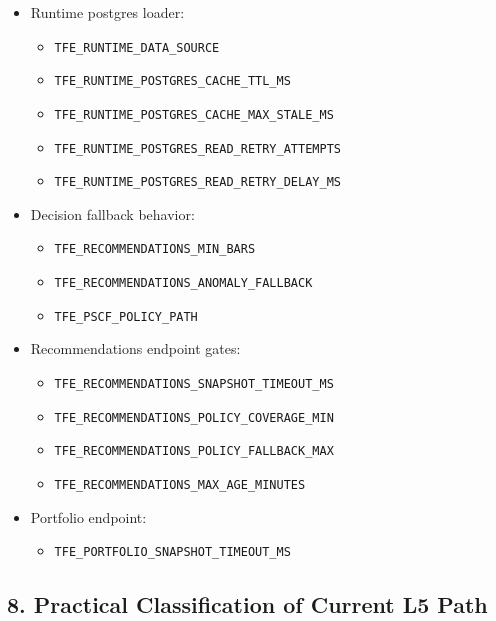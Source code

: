 \documentclass[
]{article}
\providecommand{\tightlist}{%
  \setlength{\itemsep}{0pt}\setlength{\parskip}{0pt}}
\begin{document}
\begin{itemize}
\tightlist
\item
  Runtime postgres loader:

  \begin{itemize}
  \tightlist
  \item
    \texttt{TFE\_RUNTIME\_DATA\_SOURCE}
  \item
    \texttt{TFE\_RUNTIME\_POSTGRES\_CACHE\_TTL\_MS}
  \item
    \texttt{TFE\_RUNTIME\_POSTGRES\_CACHE\_MAX\_STALE\_MS}
  \item
    \texttt{TFE\_RUNTIME\_POSTGRES\_READ\_RETRY\_ATTEMPTS}
  \item
    \texttt{TFE\_RUNTIME\_POSTGRES\_READ\_RETRY\_DELAY\_MS}
  \end{itemize}
\item
  Decision fallback behavior:

  \begin{itemize}
  \tightlist
  \item
    \texttt{TFE\_RECOMMENDATIONS\_MIN\_BARS}
  \item
    \texttt{TFE\_RECOMMENDATIONS\_ANOMALY\_FALLBACK}
  \item
    \texttt{TFE\_PSCF\_POLICY\_PATH}
  \end{itemize}
\item
  Recommendations endpoint gates:

  \begin{itemize}
  \tightlist
  \item
    \texttt{TFE\_RECOMMENDATIONS\_SNAPSHOT\_TIMEOUT\_MS}
  \item
    \texttt{TFE\_RECOMMENDATIONS\_POLICY\_COVERAGE\_MIN}
  \item
    \texttt{TFE\_RECOMMENDATIONS\_POLICY\_FALLBACK\_MAX}
  \item
    \texttt{TFE\_RECOMMENDATIONS\_MAX\_AGE\_MINUTES}
  \end{itemize}
\item
  Portfolio endpoint:

  \begin{itemize}
  \tightlist
  \item
    \texttt{TFE\_PORTFOLIO\_SNAPSHOT\_TIMEOUT\_MS}
  \end{itemize}
\end{itemize}

\subsection{8. Practical Classification of Current L5
Path}\label{8-practical-classification-of-current-l5-path}
\end{document}
